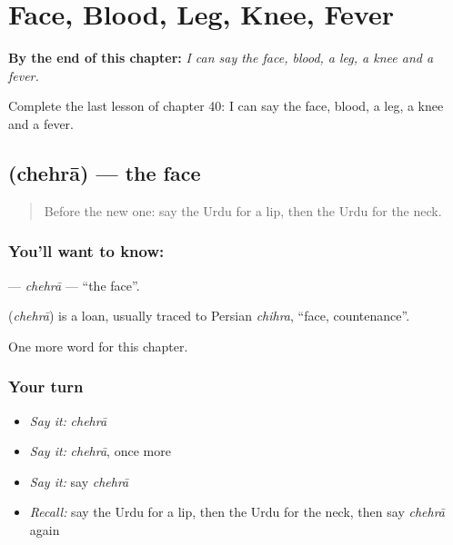 
\chapter{Face, Blood, Leg, Knee, Fever}
\label{ch:ur-face-blood-leg-knee-fever}

\begin{chapteropening}
\textbf{By the end of this chapter:} \emph{I can say the face, blood, a leg, a knee and a fever.}

Complete the last lesson of chapter 40: I can say the face, blood, a leg, a knee and a fever.
\end{chapteropening}

\section[\texorpdfstring{\ur{چہرہ} (chehrā)}{چہرہ (chehrā)}]{ (chehrā) — the face}

\label{lesson:UR-C40-chehra}



\begin{quote}
Before the new one: say the Urdu for a lip, then the Urdu for the neck.
\end{quote}

\subsection*{You'll want to know: }
\textbf{} — \emph{chehrā} — \textquotedblleft{}the face\textquotedblright{}.

\begin{cousinweb}
\textbf{} (\emph{chehrā}) is a loan, usually traced to Persian \emph{chihra}, \textquotedblleft{}face, countenance\textquotedblright{}.
\end{cousinweb}

\begin{grammarlens}[title={What you've built}]
One more word for this chapter.
\end{grammarlens}

\subsection*{Your turn}
\begin{itemize}
\raggedright
  \item \emph{Say it:} \emph{chehrā}
  \item \emph{Say it:} \emph{chehrā}, once more
  \item \emph{Say it:} say \emph{chehrā}
  \item \emph{Recall:} say the Urdu for a lip, then the Urdu for the neck, then say \emph{chehrā} again
\end{itemize}

